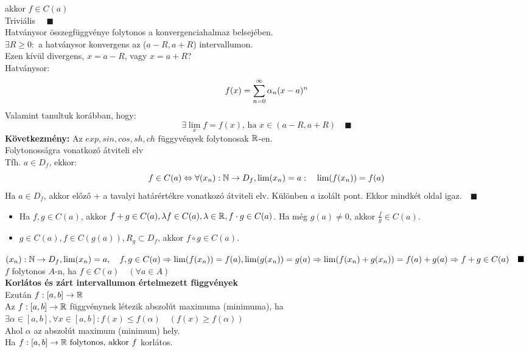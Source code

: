 \documentclass[a4paper,11pt]{article}
\begin{document}
akkor $f\in C(a)$\\[0.1cm]\biz Triviális $\quad\blacksquare$\\[0.2cm]\tetel
Hatványsor összegfüggvénye folytonos a konvergenciahalmaz belsejében.
\\[0.1cm]\biz $\exists R\geq0:$ a hatványsor konvergens az ($a-R,a+R$)
intervallumon.\\[0.1cm]Ezen kívül divergens, $x=a-R$, vagy $x=a+R$?
\\[0.1cm]Hatványsor:\[f(x)=\displaystyle\sum_{n=0}^{\infty} \alpha_n(x-a)^n\]
Valamint tanultuk korábban, hogy:\[\exists\lim_x f=f(x)\text{, ha }
x\in(a-R,a+R)\quad\blacksquare\]\textbf{Következmény:} Az $exp,sin,cos,sh,ch$
függyvények folytonosak $\mathbb{R}$-en.\\[0.2cm]
\tetel Folytonosságra vonatkozó átviteli elv\\[0.1cm] Tfh. $a\in D_f$, ekkor:
\[f\in C(a)\Leftrightarrow\forall(x_n):\mathbb{N}\to D_f,
\lim(x_n)=a:\quad\lim(f(x_n))=f(a)\]
\biz Ha $a\in D_f$, akkor előző + a tavalyi határértékre vonatkozó átviteli elv.
Különben $a$ izolált pont. Ekkor mindkét oldal igaz.$\quad\blacksquare$\\[0.1cm] 
\tetel
\begin{itemize}
	\item Ha $f,g\in C(a)$, akkor $f+g\in C(a),\lambda f\in C(a), \lambda\in\mathbb{R},f\cdot g\in C(a)$. Ha még $g(a)\neq0$, akkor $\frac{f}{g}\in C(a)$.
	\item $g\in C(a), f\in C(g(a)), R_g\subset D_f$, akkor $f\circ g\in C(a)$.
\end{itemize}
\newpage\biz $(x_n):\mathbb{N}\to D_f, \lim(x_n)=a,\quad f,g\in C(a)\Rightarrow 
\lim(f(x_n))=f(a), \lim(g(x_n))=g(a)\\[0.1cm]\Rightarrow\lim(f(x_n)+g(x_n))= 
f(a)+g(a)\Rightarrow f+g\in C(a)\quad\blacksquare$\\[0.2cm] $f$ folytonos 
$A$-n, ha $f\in C(a)\quad(\forall a\in A)$\\[0.3cm]
\textbf{{\large Korlátos és zárt intervallumon értelmezett függvények}}\\[0.2cm]
Ezután $f:[a,b]\to\mathbb{R}$\\[0.2cm]  Az $f:[a,b]\to\mathbb{R}$ függvénynek létezik abszolút 
maximuma (minimuma), ha\\[0.2cm] $\exists\alpha\in[a,b],\forall x\in [a,b]:f(x)\leq 
f(\alpha)\quad (f(x)\geq f(\alpha))$\\[0.1cm] Ahol $\alpha$ az abszolút maximum 
(minimum) hely.\\[0.2cm]
\tetel Ha $f:[a,b]\to\mathbb{R} \text{ folytonos, akkor } f $ korlátos. \\[0.1cm]	
\end{document}
